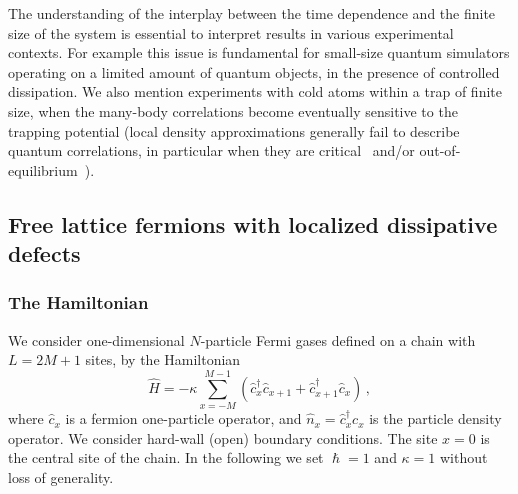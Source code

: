   
  The understanding of the interplay between the time dependence and the
  finite size of the system is essential to interpret results in various
  experimental contexts. For example this issue is fundamental for
  small-size quantum simulators operating on a limited amount of quantum
  objects, in the presence of controlled dissipation. We also mention
  experiments with cold atoms within a trap of finite size, when the
  many-body correlations become eventually sensitive to the trapping
  potential (local density approximations generally fail to describe
  quantum correlations, in particular when they are
  critical~\cite{CTV-13} and/or out-of-equilibrium~\cite{rossini2021coherent}).
  
  
  \subsection{Free lattice fermions  with localized dissipative defects}
  \label{modeldiss}
  
  \subsubsection{The Hamiltonian}
  \label{model}
  
  We consider one-dimensional $N$-particle Fermi gases defined on a
  chain with $L=2M+1$ sites, by the Hamiltonian
  \begin{equation}
    \hat H =
    - \kappa \sum _{x=-M}^{M-1} 
    (\hat c_{x}^\dagger \hat c_{x+1} +  \hat c_{x+1}^\dagger \hat c_{x})\,,
    \label{Hfree}
  \end{equation}
  where $\hat c_x$ is a fermion one-particle operator, and $\hat n_x =
  \hat c_x^\dagger c_x$ is the particle density operator.  We consider
  hard-wall (open) boundary conditions.  The site $x=0$ is the central
  site of the chain.  In the following we set $\hslash=1$ and $\kappa=1$
  without loss of generality.
  
